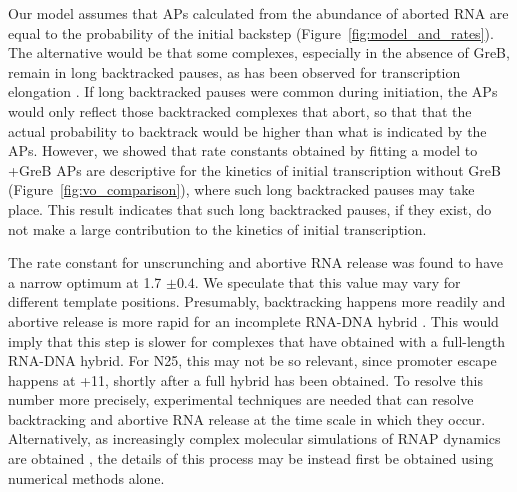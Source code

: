 
Our model assumes that APs calculated from the abundance of aborted RNA are
equal to the probability of the initial backstep
(Figure~\ref{fig:model_and_rates}). The alternative would be that some
complexes, especially in the absence of GreB, remain in long backtracked
pauses, as has been observed for transcription elongation
\cite{shaevitz_backtracking_2003}. If long backtracked pauses were common
during initiation, the APs would only reflect those backtracked
complexes that abort, so that that the actual probability to backtrack would
be higher than what is indicated by the APs. However, we showed that rate
constants obtained by fitting a model to +GreB APs are descriptive for the
kinetics of initial transcription without GreB
(Figure~\ref{fig:vo_comparison}), where such long backtracked pauses may take
place. This result indicates that such long backtracked pauses, if they exist,
do not make a large contribution to the kinetics of initial transcription.

The rate constant for unscrunching and abortive RNA release was found to have
a narrow optimum at 1.7 $\pm 0.4$. We speculate that this value may vary for
different template positions. Presumably, backtracking happens more readily
and abortive release is more rapid for an incomplete RNA-DNA hybrid
\cite{nudler_rnadna_1997,komissarova_shortening_2002}. This would imply that
this step is slower for complexes that have obtained with a full-length
RNA-DNA hybrid. For N25, this may not be so relevant, since promoter escape
happens at +11, shortly after a full hybrid has been obtained. To resolve
this number more precisely, experimental techniques are needed that can
resolve backtracking and abortive RNA release at the time scale in which they
occur. Alternatively, as increasingly complex molecular simulations of RNAP
dynamics are obtained \cite{silva_millisecond_2014}, the details of this
process may be instead first be obtained using numerical methods alone.

